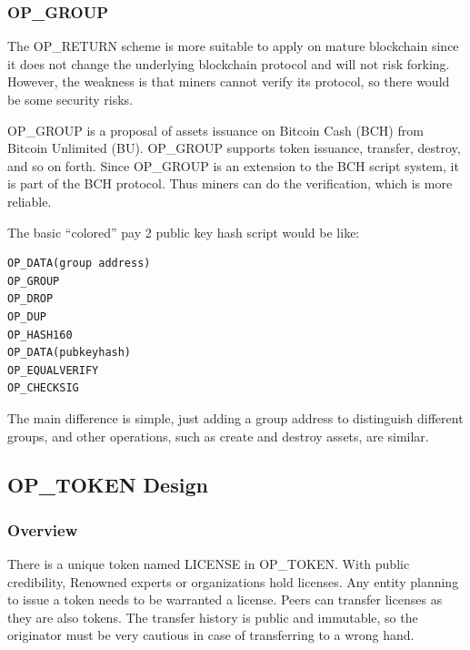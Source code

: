 \documentclass[a4paper,11pt]{article}
\begin{document}



\subsubsection{OP\_GROUP}
The OP\_RETURN scheme is more suitable to apply on mature blockchain since it does not change the underlying blockchain protocol and will not risk forking. However, the weakness is that miners cannot verify its protocol, so there would be some security risks.

OP\_GROUP is a proposal of assets issuance on Bitcoin Cash (BCH) from Bitcoin Unlimited (BU). OP\_GROUP supports token issuance, transfer, destroy, and so on forth. Since OP\_GROUP is an extension to the BCH script system,  it is part of the BCH protocol. Thus miners can do the verification, which is more reliable.

The basic “colored” pay 2 public key hash script would be like: 

\lstset{basicstyle=\tiny,style=myListStyle}
\begin{lstlisting}[numbers=none]
OP_DATA(group address)  
OP_GROUP  
OP_DROP  
OP_DUP  
OP_HASH160  
OP_DATA(pubkeyhash)  
OP_EQUALVERIFY  
OP_CHECKSIG
\end{lstlisting}

The main difference is simple, just adding a group address to distinguish different groups, and other operations, such as create and destroy assets, are similar.


\subsection{OP\_TOKEN Design}

\subsubsection{Overview}

There is a unique token named LICENSE in OP\_TOKEN. With public credibility, Renowned experts or organizations hold licenses. Any entity planning to issue a token needs to be warranted a license.  Peers can transfer licenses as they are also tokens. The transfer history is public and immutable, so the originator must be very cautious in case of transferring to a wrong hand.
\end{document}
